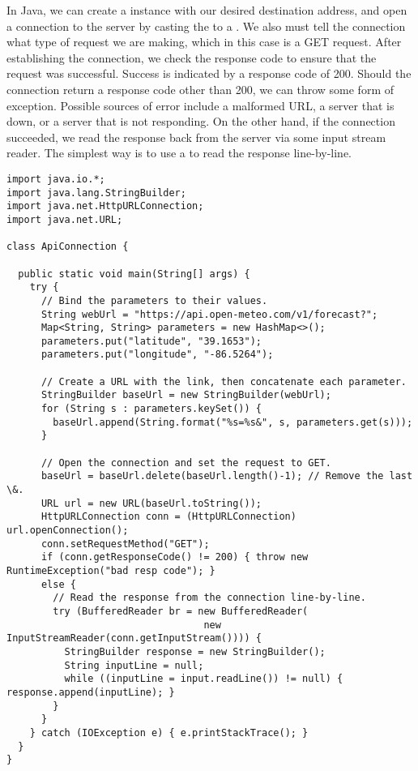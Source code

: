 In Java, we can create a  instance with our desired destination address, and open a connection to the server by casting the  to a . 
We also must tell the connection what type of request we are making, which in this case is a GET request. 
After establishing the connection, we check the response code to ensure that the request was successful. 
Success is indicated by a response code of 200. 
Should the connection return a response code other than 200, we can throw some form of exception. 
Possible sources of error include a malformed URL, a server that is down, or a server that is not responding.
On the other hand, if the connection succeeded, we read the response back from the server via some input stream reader. 
The simplest way is to use a  to read the response line-by-line.

\enlargethispage{2\baselineskip}
\begin{lstlisting}[language=MyJava]
import java.io.*;
import java.lang.StringBuilder;
import java.net.HttpURLConnection;
import java.net.URL;

class ApiConnection {

  public static void main(String[] args) {
    try {
      // Bind the parameters to their values.
      String webUrl = "https://api.open-meteo.com/v1/forecast?";
      Map<String, String> parameters = new HashMap<>();
      parameters.put("latitude", "39.1653");
      parameters.put("longitude", "-86.5264");

      // Create a URL with the link, then concatenate each parameter.
      StringBuilder baseUrl = new StringBuilder(webUrl);
      for (String s : parameters.keySet()) { 
        baseUrl.append(String.format("%s=%s&", s, parameters.get(s))); 
      }
    
      // Open the connection and set the request to GET.
      baseUrl = baseUrl.delete(baseUrl.length()-1); // Remove the last \&.
      URL url = new URL(baseUrl.toString());
      HttpURLConnection conn = (HttpURLConnection) url.openConnection();
      conn.setRequestMethod("GET");
      if (conn.getResponseCode() != 200) { throw new RuntimeException("bad resp code"); } 
      else {
        // Read the response from the connection line-by-line.
        try (BufferedReader br = new BufferedReader(
                                  new InputStreamReader(conn.getInputStream()))) {
          StringBuilder response = new StringBuilder();
          String inputLine = null;
          while ((inputLine = input.readLine()) != null) { response.append(inputLine); }
        }
      }
    } catch (IOException e) { e.printStackTrace(); }
  }
}
\end{lstlisting}

